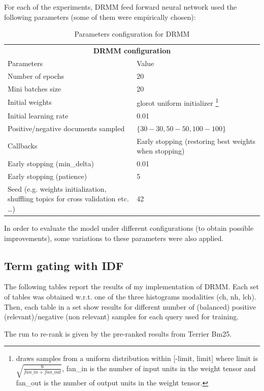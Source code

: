For each of the experiments, DRMM feed forward neural network used the following parameters (some of them were empirically chosen):

\begin{table}[H]
\centering
\begin{tabular}{p{8cm}|p{5cm}}
\multicolumn{2}{c}{\textbf{DRMM configuration}} \\
Parameters & Value \\ \hline
Number of epochs & 20 \\
Mini batches size & 20 \\
Initial weights & glorot uniform initializer \footnote{draws samples from a uniform distribution within [-limit, limit] where limit is $\sqrt{\frac{6}{fan\_in + fan\_out}}$, fan\_in is the number of input units in the weight tensor and fan\_out is the number of output units in the weight tensor.} \\
Initial learning rate & 0.01 \\
Positive/negative documents sampled & $\{30-30, 50-50, 100-100\}$ \\
Callbacks & Early stopping (restoring best weights when stopping) \\
Early stopping (min\_delta) & 0.01 \\
Early stopping (patience) & 5 \\
Seed (e.g. weights initialization, shuffling topics for cross validation etc. \dots) & 42
\end{tabular}
\caption{Parameters configuration for DRMM}
\label{table:drmm_config}
\end{table}

In order to evaluate the model under different configurations (to obtain possible improvements), some variations to these parameters were also applied.

\subsection{Term gating with IDF}
\label{ssec:tgidf}

The following tables report the results of my implementation of DRMM. Each set of tables was obtained w.r.t. one of the three histograms modalities (ch, nh, lch). Then, each table in a set show results for different number of (balanced) positive (relevant)/negative (non relevant) samples for each query used for training.

The run to re-rank is given by the pre-ranked results from Terrier Bm25.

